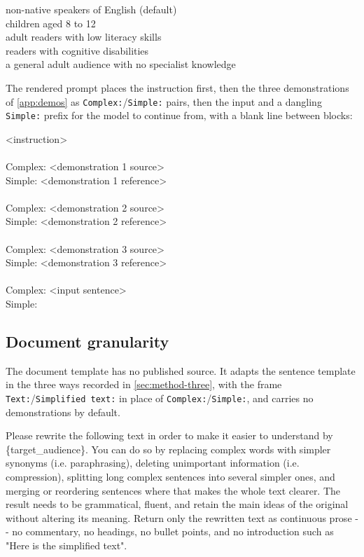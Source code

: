 \begin{promptbox}
	non-native speakers of English \hfill (default) \\
	children aged 8 to 12 \\
	adult readers with low literacy skills \\
	readers with cognitive disabilities \\
	a general adult audience with no specialist knowledge
\end{promptbox}

The rendered prompt places the instruction first, then the three demonstrations of \cref{app:demos} as \texttt{Complex:}/\texttt{Simple:} pairs, then the input and a dangling \texttt{Simple:} prefix for the model to continue from, with a blank line between blocks:

\begin{promptbox}
	<instruction> \\
	\\
	Complex: <demonstration 1 source> \\
	Simple: <demonstration 1 reference> \\
	\\
	Complex: <demonstration 2 source> \\
	Simple: <demonstration 2 reference> \\
	\\
	Complex: <demonstration 3 source> \\
	Simple: <demonstration 3 reference> \\
	\\
	Complex: <input sentence> \\
	Simple:
\end{promptbox}

\subsection{Document granularity}

The document template has no published source.
It adapts the sentence template in the three ways recorded in \cref{sec:method-three}, with the frame \texttt{Text:}/\texttt{Simplified text:} in place of \texttt{Complex:}/\texttt{Simple:}, and carries no demonstrations by default.

\begin{promptbox}
	Please rewrite the following text in order to make it easier to understand by \{target\_audience\}. You can do so by replacing complex words with simpler synonyms (i.e. paraphrasing), deleting unimportant information (i.e. compression), splitting long complex sentences into several simpler ones, and merging or reordering sentences where that makes the whole text clearer. The result needs to be grammatical, fluent, and retain the main ideas of the original without altering its meaning. Return only the rewritten text as continuous prose -{}- no commentary, no headings, no bullet points, and no introduction such as "Here is the simplified text".
\end{promptbox}

